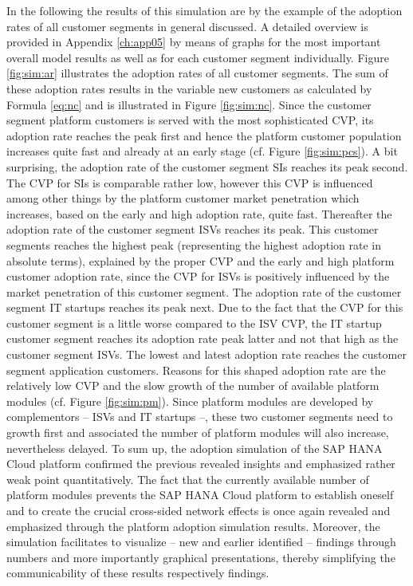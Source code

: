 In the following the results of this simulation are by the example of the adoption rates of all customer segments in general discussed. A detailed overview is provided in Appendix \ref{ch:app05} by means of graphs for the most important overall model results as well as for each customer segment individually. Figure \ref{fig:sim:ar} illustrates the adoption rates of all customer segments. The sum of these adoption rates results in the variable new customers as calculated by Formula \ref{eq:nc} and is illustrated in Figure \ref{fig:sim:nc}. Since the customer segment platform customers is served with the most sophisticated \ac{CVP}, its adoption rate reaches the peak first and hence the platform customer population increases quite fast and already at an early stage (cf. Figure \ref{fig:sim:pcs}). A bit surprising, the adoption rate of the customer segment \acp{SI} reaches its peak second. The \ac{CVP} for \acp{SI} is comparable rather low, however this \ac{CVP} is influenced among other things by the platform customer market penetration which increases, based on the early and high adoption rate, quite fast. Thereafter the adoption rate of the customer segment \acp{ISV} reaches its peak. This customer segments reaches the highest peak (representing the highest adoption rate in absolute terms), explained by the proper \ac{CVP} and the early and high platform customer adoption rate, since the \ac{CVP} for \acp{ISV} is positively influenced by the market penetration of this customer segment. The adoption rate of the customer segment \ac{IT} startups reaches its peak next. Due to the fact that the \ac{CVP} for this customer segment is a little worse compared to the \ac{ISV} \ac{CVP}, the \ac{IT} startup customer segment reaches its adoption rate peak latter and not that high as the customer segment \acp{ISV}. The lowest and latest adoption rate reaches the customer segment application customers. Reasons for this shaped adoption rate are the relatively low \ac{CVP} and the slow growth of the number of available platform modules (cf. Figure \ref{fig:sim:pm}). Since platform modules are developed by complementors -- \acp{ISV} and \ac{IT} startups --, these two customer segments need to growth first and associated the number of platform modules will also increase, nevertheless delayed. To sum up, the adoption simulation of the SAP HANA Cloud platform confirmed the previous revealed insights and emphasized rather weak point quantitatively. The fact that the currently available number of platform modules prevents the SAP HANA Cloud platform to establish oneself and to create the crucial cross-sided network effects is once again revealed and emphasized through the platform adoption simulation results. Moreover, the simulation facilitates to visualize -- new and earlier identified -- findings through numbers and more importantly graphical presentations, thereby simplifying the communicability of these results respectively findings.

